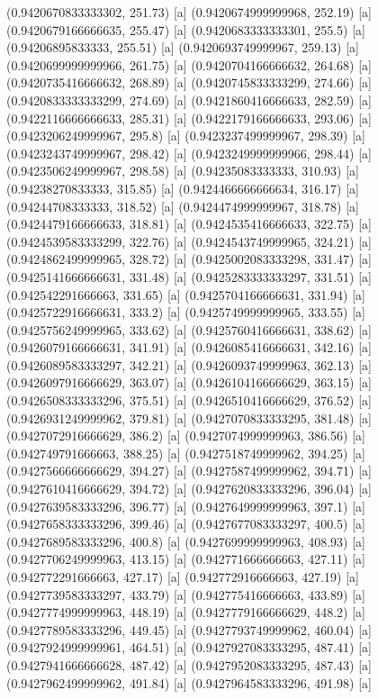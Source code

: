 {{{(0.9420670833333302, 251.73) [a] 
(0.9420674999999968, 252.19) [a] 
(0.9420679166666635, 255.47) [a] 
(0.9420683333333301, 255.5) [a] 
(0.94206895833333, 255.51) [a] 
(0.9420693749999967, 259.13) [a] 
(0.9420699999999966, 261.75) [a] 
(0.9420704166666632, 264.68) [a] 
(0.9420735416666632, 268.89) [a] 
(0.9420745833333299, 274.66) [a] 
(0.9420833333333299, 274.69) [a] 
(0.9421860416666633, 282.59) [a] 
(0.9422116666666633, 285.31) [a] 
(0.9422179166666633, 293.06) [a] 
(0.9423206249999967, 295.8) [a] 
(0.9423237499999967, 298.39) [a] 
(0.9423243749999967, 298.42) [a] 
(0.9423249999999966, 298.44) [a] 
(0.9423506249999967, 298.58) [a] 
(0.94235083333333, 310.93) [a] 
(0.94238270833333, 315.85) [a] 
(0.9424466666666634, 316.17) [a] 
(0.94244708333333, 318.52) [a] 
(0.9424474999999967, 318.78) [a] 
(0.9424479166666633, 318.81) [a] 
(0.9424535416666633, 322.75) [a] 
(0.9424539583333299, 322.76) [a] 
(0.9424543749999965, 324.21) [a] 
(0.9424862499999965, 328.72) [a] 
(0.9425002083333298, 331.47) [a] 
(0.9425141666666631, 331.48) [a] 
(0.9425283333333297, 331.51) [a] 
(0.942542291666663, 331.65) [a] 
(0.9425704166666631, 331.94) [a] 
(0.9425722916666631, 333.2) [a] 
(0.9425749999999965, 333.55) [a] 
(0.9425756249999965, 333.62) [a] 
(0.9425760416666631, 338.62) [a] 
(0.9426079166666631, 341.91) [a] 
(0.9426085416666631, 342.16) [a] 
(0.9426089583333297, 342.21) [a] 
(0.9426093749999963, 362.13) [a] 
(0.9426097916666629, 363.07) [a] 
(0.9426104166666629, 363.15) [a] 
(0.9426508333333296, 375.51) [a] 
(0.9426510416666629, 376.52) [a] 
(0.9426931249999962, 379.81) [a] 
(0.9427070833333295, 381.48) [a] 
(0.9427072916666629, 386.2) [a] 
(0.9427074999999963, 386.56) [a] 
(0.942749791666663, 388.25) [a] 
(0.9427518749999962, 394.25) [a] 
(0.9427566666666629, 394.27) [a] 
(0.9427587499999962, 394.71) [a] 
(0.9427610416666629, 394.72) [a] 
(0.9427620833333296, 396.04) [a] 
(0.9427639583333296, 396.77) [a] 
(0.9427649999999963, 397.1) [a] 
(0.9427658333333296, 399.46) [a] 
(0.9427677083333297, 400.5) [a] 
(0.9427689583333296, 400.8) [a] 
(0.9427699999999963, 408.93) [a] 
(0.9427706249999963, 413.15) [a] 
(0.942771666666663, 427.11) [a] 
(0.942772291666663, 427.17) [a] 
(0.942772916666663, 427.19) [a] 
(0.9427739583333297, 433.79) [a] 
(0.942775416666663, 433.89) [a] 
(0.9427774999999963, 448.19) [a] 
(0.9427779166666629, 448.2) [a] 
(0.9427789583333296, 449.45) [a] 
(0.9427793749999962, 460.04) [a] 
(0.9427924999999961, 464.51) [a] 
(0.9427927083333295, 487.41) [a] 
(0.9427941666666628, 487.42) [a] 
(0.9427952083333295, 487.43) [a] 
(0.9427962499999962, 491.84) [a] 
(0.9427964583333296, 491.98) [a] 
}}}
